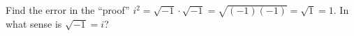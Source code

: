 Find the error in the ``proof'' $i^2=\sqrt{-1}\cdot\sqrt{-1}=\sqrt{(-1)(-1)}=\sqrt1=1$. In what sense is $\sqrt{-1}=i$?
